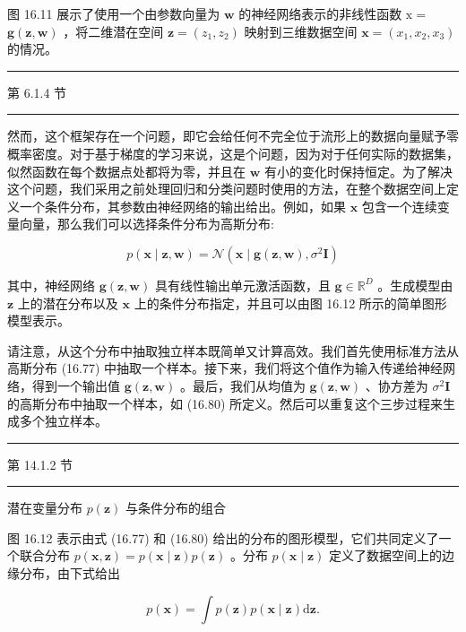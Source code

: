 \documentclass[10pt]{report}
\newcommand{\HRule}{\begin{center}\rule{0.9\linewidth}{0.2mm}\end{center}}
\begin{document}
图 16.11 展示了使用一个由参数向量为 \(\mathbf{w}\) 的神经网络表示的非线性函数 \(\mathrm{x} =\)  \(\mathbf{g}\left( {\mathbf{z},\mathbf{w}}\right)\) ，将二维潜在空间 \(\mathbf{z} = \left( {{z}_{1},{z}_{2}}\right)\) 映射到三维数据空间 \(\mathbf{x} = \left( {{x}_{1},{x}_{2},{x}_{3}}\right)\) 的情况。

\HRule

第 6.1.4 节

\HRule

然而，这个框架存在一个问题，即它会给任何不完全位于流形上的数据向量赋予零概率密度。对于基于梯度的学习来说，这是个问题，因为对于任何实际的数据集，似然函数在每个数据点处都将为零，并且在 \(\mathbf{w}\) 有小的变化时保持恒定。为了解决这个问题，我们采用之前处理回归和分类问题时使用的方法，在整个数据空间上定义一个条件分布，其参数由神经网络的输出给出。例如，如果 \(\mathbf{x}\) 包含一个连续变量向量，那么我们可以选择条件分布为高斯分布:

\[
p\left( {\mathbf{x} \mid  \mathbf{z},\mathbf{w}}\right)  = \mathcal{N}\left( {\mathbf{x} \mid  \mathbf{g}\left( {\mathbf{z},\mathbf{w}}\right) ,{\sigma }^{2}\mathbf{I}}\right)  \tag{16.80}
\]

其中，神经网络 \(\mathbf{g}\left( {\mathbf{z},\mathbf{w}}\right)\) 具有线性输出单元激活函数，且 \(\mathbf{g} \in  {\mathbb{R}}^{D}\) 。生成模型由 \(\mathbf{z}\) 上的潜在分布以及 \(\mathbf{x}\) 上的条件分布指定，并且可以由图 16.12 所示的简单图形模型表示。

请注意，从这个分布中抽取独立样本既简单又计算高效。我们首先使用标准方法从高斯分布 (16.77) 中抽取一个样本。接下来，我们将这个值作为输入传递给神经网络，得到一个输出值 \(\mathbf{g}\left( {\mathbf{z},\mathbf{w}}\right)\) 。最后，我们从均值为 \(\mathbf{g}\left( {\mathbf{z},\mathbf{w}}\right)\) 、协方差为 \({\sigma }^{2}\mathbf{I}\) 的高斯分布中抽取一个样本，如 (16.80) 所定义。然后可以重复这个三步过程来生成多个独立样本。

\HRule

第 14.1.2 节

\HRule

潜在变量分布 \(p\left( \mathbf{z}\right)\) 与条件分布的组合

图 16.12 表示由式 (16.77) 和 (16.80) 给出的分布的图形模型，它们共同定义了一个联合分布 \(p\left( {\mathbf{x},\mathbf{z}}\right)  = p\left( {\mathbf{x} \mid  \mathbf{z}}\right) p\left( \mathbf{z}\right)\) 。分布 \(p\left( {\mathbf{x} \mid  \mathbf{z}}\right)\) 定义了数据空间上的边缘分布，由下式给出

\[
p\left( \mathbf{x}\right)  = \int p\left( \mathbf{z}\right) p\left( {\mathbf{x} \mid  \mathbf{z}}\right) \mathrm{d}\mathbf{z}. \tag{16.81}
\]
\end{document}
